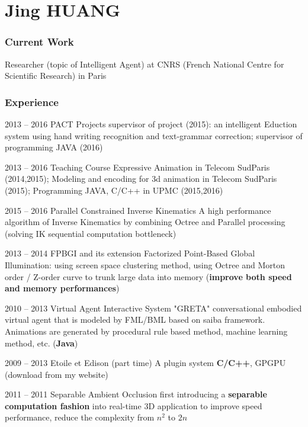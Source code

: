 \documentclass{tccv}
\begin{document}
\part{Jing HUANG}
\section{Current Work}
Researcher (topic of Intelligent Agent) at CNRS (French National Centre for Scientific Research) in Paris

\section{Experience}
\begin{eventlist}
\item{2013 -- 2016}
     {PACT Projects}
     {supervisor of project (2015): an intelligent Eduction system using hand writing recognition and text-grammar correction; supervisor of programming JAVA (2016)}
		
\item{2013 -- 2016}
     {Teaching Course}
     {Expressive Animation in Telecom SudParis (2014,2015); Modeling and encoding for 3d animation in Telecom SudParis (2015);
			Programming JAVA, C/C++ in UPMC (2015,2016)}
			
\item{2015 -- 2016}
     {Parallel Constrained Inverse Kinematics}
     {A high performance algorithm of Inverse Kinematics by combining Octree and Parallel processing (solving IK sequential computation bottleneck)}
		
\item{2013 -- 2014}
     {FPBGI and its extension}
     {Factorized Point-Based Global Illumination: using screen space clustering method, using Octree and Morton order / Z-order curve to trunk large data into memory (\textbf{improve both speed and memory performances})}

\item{2010 -- 2013}
     {Virtual Agent Interactive System "GRETA"}
		 {conversational embodied virtual agent that is modeled by FML/BML based on saiba framework. Animations are generated by procedural rule based method, machine learning method, etc. 
		(\textbf{Java})
		}
		
\item{2009 -- 2013}
     {Etoile et Edison (part time)}
     {A plugin system \textbf{C/C++}, GPGPU (download from my website)}
		
\item{2011 -- 2011}
		 {Separable Ambient Occlusion}
		 {first introducing a \textbf{separable computation fashion} into real-time 3D application to improve speed performance, reduce the complexity from $n^2$ to $2n$}
		

\end{eventlist}
\end{document}
